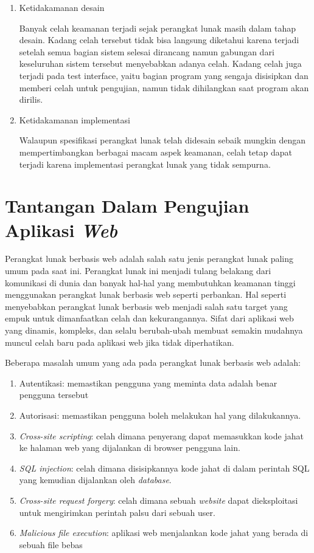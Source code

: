 \begin{enumerate}
    \item Ketidakamanan desain

    Banyak celah keamanan terjadi sejak perangkat lunak masih dalam tahap desain.
    Kadang celah tersebut tidak bisa langsung diketahui karena terjadi setelah semua
    bagian sistem selesai dirancang namun gabungan dari keseluruhan sistem tersebut
    menyebabkan adanya celah.
    Kadang celah juga terjadi pada test interface, yaitu bagian program yang sengaja
    disisipkan dan memberi celah untuk pengujian, namun tidak dihilangkan saat program akan dirilis.

    \item Ketidakamanan implementasi

    Walaupun spesifikasi perangkat lunak telah didesain sebaik mungkin dengan
    mempertimbangkan berbagai macam aspek keamanan,
    celah tetap dapat terjadi karena implementasi perangkat lunak yang tidak sempurna.

\end{enumerate}

\section{Tantangan Dalam Pengujian Aplikasi \textit{Web}}

Perangkat lunak berbasis web adalah salah satu jenis perangkat lunak paling umum pada saat ini.
Perangkat lunak ini menjadi tulang belakang dari komunikasi di dunia dan banyak hal-hal
yang membutuhkan keamanan tinggi menggunakan perangkat lunak berbasis web seperti perbankan.
Hal seperti menyebabkan perangkat lunak berbasis web menjadi salah satu target yang empuk untuk
dimanfaatkan celah dan kekurangannya. Sifat dari aplikasi web yang dinamis, kompleks, dan
selalu berubah-ubah membuat semakin mudahnya muncul celah baru pada aplikasi web jika tidak diperhatikan.

Beberapa masalah umum yang ada pada perangkat lunak berbasis web adalah:
\begin{enumerate}
    \item Autentikasi: memastikan pengguna yang meminta data adalah benar pengguna tersebut
    \item Autorisasi: memastikan pengguna boleh melakukan hal yang dilakukannya.

    \item \textit{Cross-site scripting}:
    celah dimana penyerang dapat memasukkan kode jahat ke halaman web yang dijalankan di browser pengguna lain.

    \item \textit{SQL injection}:
    celah dimana disisipkannya kode jahat di dalam perintah SQL yang kemudian dijalankan oleh \textit{database}.

    \item \textit{Cross-site request forgery}:
    celah dimana sebuah \textit{website} dapat dieksploitasi untuk mengirimkan perintah palsu dari sebuah user.

    \item \textit{Malicious file execution}:
    aplikasi web menjalankan kode jahat yang berada di sebuah file bebas
\end{enumerate}

